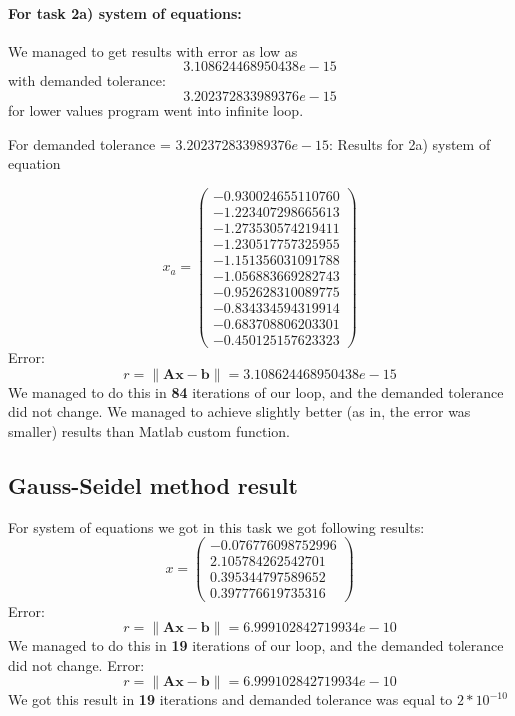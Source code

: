 \documentclass[12pt]{report}
\begin{document}
\newpage
\paragraph{For task 2a) system of equations:}
We managed to get results with error as low as
\[ 3.108624468950438e-15 \] with demanded tolerance:
\[ 3.202372833989376e-15 \]
for lower values program went into infinite loop.

For demanded tolerance = $3.202372833989376e-15$:
Results for 2a) system of equation

\[ x_a = \left( \begin{array}{cc}
-0.930024655110760 \\
-1.223407298665613 \\
-1.273530574219411 \\
-1.230517757325955 \\
-1.151356031091788 \\
-1.056883669282743 \\
-0.952628310089775 \\
-0.834334594319914 \\
-0.683708806203301 \\
-0.450125157623323
\end{array} \right)
\]
Error:
\[ r = \| \mathbf{A}\mathbf{x} - \mathbf{b}\| = 3.108624468950438e-15 \]
We managed to do this in \textbf{84} iterations of our loop, and the demanded tolerance did not change.
We managed to achieve slightly better (as in, the error was smaller) results than Matlab custom function.

\newpage
\subsection{Gauss-Seidel method result}
For system of equations we got in this task we got following results:
\\
\[ x = \left( \begin{array}{cc}
  -0.076776098752996 \\
   2.105784262542701 \\
   0.395344797589652 \\
   0.397776619735316
\end{array} \right)
\]
Error:
\[ r = \| \mathbf{A}\mathbf{x} - \mathbf{b}\| = 6.999102842719934e-10 \]
We managed to do this in \textbf{19} iterations of our loop, and the demanded tolerance did not change.
Error:
\[ r = \| \mathbf{A}\mathbf{x} - \mathbf{b}\| = 6.999102842719934e-10 \]
We got this result in \textbf{19} iterations and demanded tolerance was equal to $2*10^{-10}$
\end{document}
